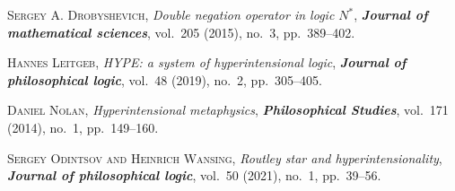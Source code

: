 \documentclass[bsl,meeting]{asl}
\begin{document}
\begin{thebibliography}{10}
{\scshape Sergey A. Drobyshevich},
{\itshape Double negation operator in logic $N^*$},
{\bfseries\itshape Journal of mathematical sciences},
vol.~205 (2015), no.~3, pp.~389--402.

{\scshape Hannes Leitgeb},
{\itshape HYPE: a system of hyperintensional logic},
{\bfseries\itshape Journal of philosophical logic},
vol.~48 (2019), no.~2, pp.~305--405. 

{\scshape Daniel Nolan},
{\itshape Hyperintensional metaphysics},
{\bfseries\itshape Philosophical Studies},
vol.~171 (2014), no.~1, pp.~149--160.

{\scshape Sergey Odintsov and Heinrich Wansing},
{\itshape Routley star and hyperintensionality},
{\bfseries\itshape Journal of philosophical logic},
vol.~50 (2021), no.~1, pp.~39--56.


\end{thebibliography}


\vspace*{-0.5\baselineskip}
\end{document}
